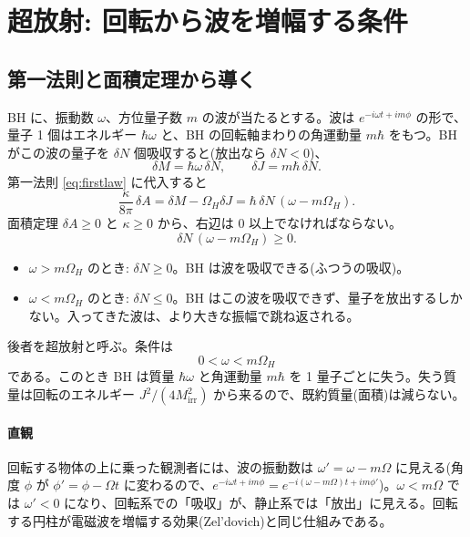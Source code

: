\section{超放射: 回転から波を増幅する条件}\label{sec:superradiance}

\subsection{第一法則と面積定理から導く}

BH に、振動数 $\omega$、方位量子数 $m$ の波が当たるとする。波は $e^{-i\omega t+im\phi}$ の形で、量子 1 個はエネルギー $\hbar\omega$ と、BH の回転軸まわりの角運動量 $m\hbar$ をもつ。BH がこの波の量子を $\delta N$ 個吸収すると(放出なら $\delta N<0$)、
\begin{equation}
\delta M=\hbar\omega\,\delta N,\qquad \delta J=m\hbar\,\delta N.
\end{equation}
第一法則 \eqref{eq:firstlaw} に代入すると
\begin{equation}
\frac{\kappa}{8\pi}\,\delta A=\delta M-\Omega_H\delta J=\hbar\,\delta N\,(\omega-m\Omega_H).
\label{eq:sr_firstlaw}
\end{equation}
面積定理 $\delta A\ge0$ と $\kappa\ge0$ から、右辺は 0 以上でなければならない。
\begin{equation}
\delta N\,(\omega-m\Omega_H)\ge0.
\end{equation}
\begin{itemize}
\item $\omega>m\Omega_H$ のとき: $\delta N\ge0$。BH は波を吸収できる(ふつうの吸収)。
\item $\omega<m\Omega_H$ のとき: $\delta N\le0$。BH はこの波を吸収できず、量子を放出するしかない。入ってきた波は、より大きな振幅で跳ね返される。
\end{itemize}
後者を超放射と呼ぶ。条件は
\begin{equation}
\boxed{\;0<\omega<m\Omega_H\;}
\label{eq:sr_condition}
\end{equation}
である。このとき BH は質量 $\hbar\omega$ と角運動量 $m\hbar$ を 1 量子ごとに失う。失う質量は回転のエネルギー $J^2/(4M_\mathrm{irr}^2)$ から来るので、既約質量(面積)は減らない。

\paragraph{直観}
回転する物体の上に乗った観測者には、波の振動数は $\omega'=\omega-m\Omega$ に見える(角度 $\phi$ が $\phi'=\phi-\Omega t$ に変わるので、$e^{-i\omega t+im\phi}=e^{-i(\omega-m\Omega)t+im\phi'}$)。$\omega<m\Omega$ では $\omega'<0$ になり、回転系での「吸収」が、静止系では「放出」に見える。回転する円柱が電磁波を増幅する効果(Zel'dovich)と同じ仕組みである。

